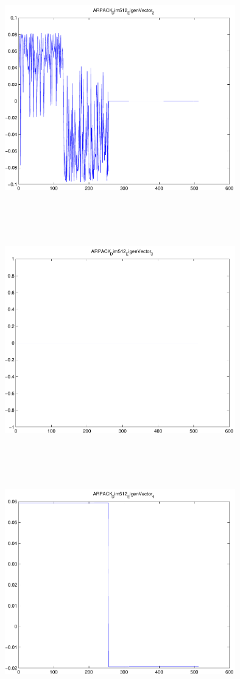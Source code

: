 \documentclass[9pt]{article}
\theoremstyle{plain}
\theoremstyle{definition}
\theoremstyle{remark}
\numberwithin{equation}{section}
\begin{document}
\includegraphics[width=10.0cm,height=10.0cm]{ARPACK_Dim512_EigenVector_2.pdf}

\includegraphics[width=10.0cm,height=10.0cm]{ARPACK_Dim512_EigenVector_3.pdf}

\includegraphics[width=10.0cm,height=10.0cm]{ARPACK_Dim512_EigenVector_4.pdf}
\end{document}
